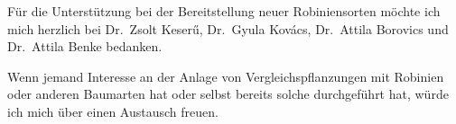 \documentclass[twocolumn]{scrartcl}
\begin{document}
Für die Unterstützung bei der Bereitstellung neuer Robiniensorten
möchte ich mich herzlich bei Dr.~Zsolt Keserű, Dr.~Gyula Kovács,
Dr.~Attila Borovics und Dr.~Attila Benke bedanken.

Wenn jemand Interesse an der Anlage von Vergleichspflanzungen mit
Robinien oder anderen Baumarten hat oder selbst bereits solche
durchgeführt hat, würde ich mich über einen Austausch freuen.



%
\printbibliography

\end{document}
